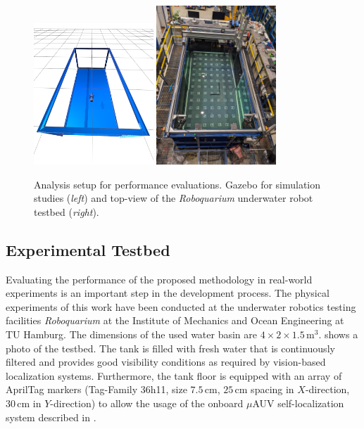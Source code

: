 \begin{figure}
    \centering
    \includegraphics[width=0.4\textwidth]{images/04/gazebo.png}
    \quad\quad
    \includegraphics[width=0.4\textwidth]{images/04/roboquarium_tested_topview.jpg}
    \caption{Analysis setup for performance evaluations. Gazebo for simulation studies (\textit{left}) and top-view of the \textit{Roboquarium} underwater robot testbed (\textit{right}).}
    \label{fig:testbed_topview}
    \label{fig:analysis_setups}
\end{figure}
\subsection{Experimental Testbed}
Evaluating the performance of the proposed methodology in real-world experiments is an important step in the development process.
The physical experiments of this work have been conducted at the underwater robotics testing facilities \textit{Roboquarium} at the Institute of Mechanics and Ocean Engineering at TU Hamburg.
The dimensions of the used water basin are $4\times2\times1.5\,\mathrm{m}^3$.
 shows a photo of the testbed.
The tank is filled with fresh water that is continuously filtered and provides good visibility conditions as required by vision-based localization systems.
Furthermore, the tank floor is equipped with an array of AprilTag markers (Tag-Family 36h11, size $7.5$\,cm, $25$\,cm spacing in $X$-direction, $30$\,cm in $Y$-direction) to allow the usage of the onboard $\mu$AUV self-localization system described in \cite{Duecker20}.


